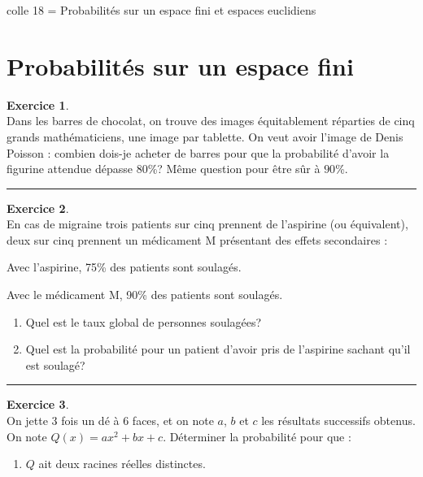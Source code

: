 \documentclass[a4paper,10pt]{article}
\theoremstyle{definition}
\theoremstyle{definition}
\newtheorem{exo}{Exercice}
\begin{document}
	
	
	\begin{center}
		\Large \sc colle 18 = Probabilités sur un espace fini et espaces euclidiens 
	\end{center}




\section*{Probabilités sur un espace fini}
\begin{minipage}{1\linewidth}
	\begin{minipage}[t]{0.48\linewidth}
		\raggedright
		
		
		

		
		\begin{exo}\quad\\
		Dans les barres de chocolat, on trouve des images équitablement
		réparties de cinq grands mathématiciens, une image par
		tablette. On veut avoir l'image de Denis Poisson : combien dois-je
		acheter de barres pour que la probabilité d'avoir la figurine attendue dépasse $80$\%? 
		Même question pour être sûr à $90$\%.
			
			\centering
			\rule{1\linewidth}{0.6pt}
		\end{exo}
		
		\begin{exo} \quad\\
		En cas de migraine trois patients sur cinq prennent de l'aspirine
		(ou équivalent), deux sur cinq prennent un médicament M présentant des effets secondaires :
		
		Avec l'aspirine, 75\% des patients sont soulagés.
		
		Avec le médicament M, 90\% des patients sont soulagés.
		\begin{enumerate}
			\item Quel est le taux global de personnes soulagées?
			
			\item Quel est la probabilité pour un patient d'avoir pris de l'aspirine
			sachant qu'il est soulagé?
		\end{enumerate}
			
			\centering
			\rule{1\linewidth}{0.6pt}
		\end{exo}
	
\begin{exo} \quad\\
	On jette 3 fois un dé à $6$ faces, et on note $a$, $b$ et $c$ les résultats successifs obtenus. On note $Q(x)=ax^2+bx+c$. Déterminer la probabilité pour que : 
\begin{enumerate}
	\item $Q$ ait deux racines réelles distinctes. 
	

\end{enumerate}
\end{exo}
\end{minipage}
\end{minipage}
\end{document}
